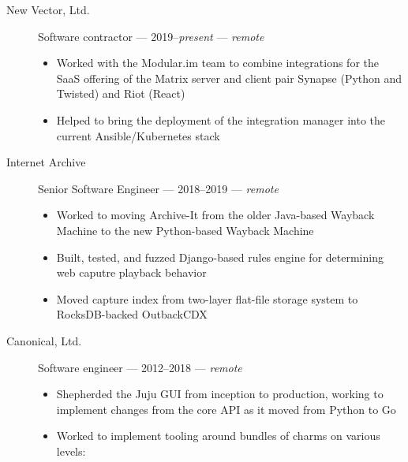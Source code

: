\documentclass[letterpaper]{memoir}
\begin{document}
\begin{description}
    \item[New Vector, Ltd.]
    Software contractor --- 2019--\emph{present} --- \emph{remote}

    \begin{itemize}
        \tightlist
        \item
        Worked with the Modular.im team to combine integrations for the SaaS offering of the Matrix server and client pair Synapse (Python and Twisted) and Riot (React)
        \item
        Helped to bring the deployment of the integration manager into the current Ansible/Kubernetes stack
    \end{itemize}
    \item[Internet Archive]
    Senior Software Engineer --- 2018--2019 --- \emph{remote}

    \begin{itemize}
        \tightlist
        \item
        Worked to moving Archive-It from the older Java-based Wayback Machine to the new Python-based Wayback Machine
        \item
        Built, tested, and fuzzed Django-based rules engine for determining web caputre playback behavior
        \item
        Moved capture index from two-layer flat-file storage system to RocksDB-backed OutbackCDX
    \end{itemize}
    \item[Canonical, Ltd.]
    Software engineer --- 2012--2018 --- \emph{remote}

    \begin{itemize}
        \tightlist
        \item
        Shepherded the Juju GUI from inception to production, working to implement changes from the core API as it moved from Python to Go
        \item
        Worked to implement tooling around bundles of charms on various levels:


\end{itemize}
\end{description}
\end{document}
